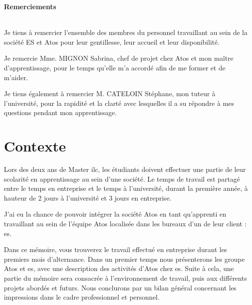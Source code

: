 \documentclass[12pt]{report}
\begin{document}
    \thispagestyle{empty}
    \vspace*{\fill}
    \begin{center}
    	\Large{\textbf{Remerciements}}
    \end{center}
    \setlength{\parskip}{1em}
    ~\\
    \indent Je tiens à remercier l’ensemble des membres du personnel travaillant au sein de la société ES et Atos pour leur gentillesse, leur accueil et leur disponibilité.
    
    Je remercie Mme. MIGNON Sabrina, chef de projet chez Atos et mon maître d'apprentissage, pour le temps qu'elle m'a accordé afin de me former et de m'aider.
    
    Je tiens également à remercier M. CATELOIN Stéphane, mon tuteur à l’université, pour la rapidité et la clarté avec lesquelles il a su répondre à mes questions pendant mon apprentissage.
    \vspace*{\fill}
    
    \setlength{\parskip}{0em}
    \pagestyle{tocAndLof}
    \tableofcontents
    \listoffigures
    \clearpage
    
    \pagestyle{plain}
    \setlength{\parskip}{1em}
    \setcounter{page}{1}
    
    \chapter{Contexte}
    Lors des deux ans de Master \acrfull{ilc}, les étudiants doivent effectuer une partie de leur scolarité en apprentissage au sein d'une société. Le temps de travail est partagé entre le temps en entreprise et le temps à l'université, durant la première année, à hauteur de 2 jours à l'université et 3 jours en entreprise.
    
    J'ai eu la chance de pouvoir intégrer la société Atos en tant qu'apprenti en travaillant au sein de l'équipe Atos localisée dans les bureaux d'un de leur client : \acrfull{es}.
    
    Dans ce mémoire, vous trouverez le travail effectué en entreprise durant les premiers mois d'alternance. Dans un premier temps nous présenterons les groupe Atos et \acrshort{es}, avec une description des activités d'Atos chez \acrshort{es}. Suite à cela, une partie du mémoire sera consacrée à l'environnement de travail, puis aux différents projets abordés et futurs. Nous conclurons par un bilan général concernant les impressions dans le cadre professionnel et personnel.
	
\end{document}
